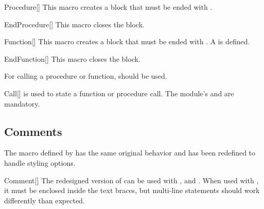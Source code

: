 \documentclass[a4paper, 11pt]{article}
\begin{document}
\begin{macro}{Procedure}[]
    This macro creates a  block that must be ended with .

    \BlockOptionsText
\end{macro}

\begin{macro}{EndProcedure}[]
    This macro closes the  block.

    \MacroOptionsText
\end{macro}

\begin{macro}{Function}[]
    This macro creates a  block that must be ended with . A  is defined.

    \BlockOptionsText
\end{macro}

\begin{macro}{EndFunction}[]
    This macro closes the  block.

    \MacroOptionsText
\end{macro}

For calling a procedure or function,  should be used.

\begin{macro}{Call}[]
    \label{call}
     is used to state a function or procedure call. The module's  and  are mandatory.

    \MacroOptionsText
\end{macro}

\subsection{Comments}\label{sec:comments}

The  macro defined by  has the same original behavior and has been redefined to handle styling options.

\begin{macro}{Comment}[]
    The redesigned version of  can be used with ,  and . When used with , it must be enclosed inside the text braces, but multi-line statements should work differently than expected.

    \MacroOptionsText
\end{macro}
\end{document}
